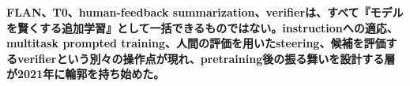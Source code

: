 \noindent\textbf{FLAN、T0、human-feedback summarization、verifierは、すべて『モデルを賢くする追加学習』として一括できるものではない。instructionへの適応、multitask prompted training、人間の評価を用いたsteering、候補を評価するverifierという別々の操作点が現れ、pretraining後の振る舞いを設計する層が2021年に輪郭を持ち始めた。}\autocite{src-34f845c1e710,src-6339600396eb,src-750bc3eeb1bc,src-7f768525daf5,src-8b2f7c40f4a4,src-90a37f62aeab}
